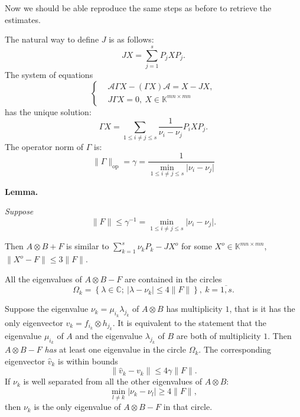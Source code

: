 \documentclass[a4paper]{jpconf}
\begin{document}
Now we should be able reproduce the same steps as before
    to retrieve the estimates.

The natural way to define \( J \) is as follows:
    \[
        JX = \sum_{j=1}^s P_j X P_j.
    \]
The system of equations
    \[\left\{\begin{aligned}
        & \mathcal{A}\Gamma X - (\Gamma X) \mathcal{A} = X - JX, \\
        & J\Gamma X = 0,\ X\in \mathbb{K}^{mn{\times}mn}
    \end{aligned}\right.\]
    has the unique solution:
    \[
        \Gamma X = \sum_{1\leq i{\neq}j \leq s} \frac{1}{\nu_i-\nu_j} P_i X P_j.
    \]
    The operator norm of \( \Gamma \) is:
    \[
        \|\Gamma\|_{\mathrm{op}} = \gamma = \frac{1}{\min_{1\leq i{\neq}j\leq s}\lvert\nu_i - \nu_j\rvert}
    \]


\begin{center}
\textbf{Lemma.}
{\it
    Suppose
    \[
        \|F\| \leq \gamma^{-1} = \min_{1\leq i{\neq}j\leq s}\lvert\nu_i - \nu_j\rvert.
    \]

    Then \( A{\otimes}B + F \) is similar to
    \( \sum_{k=1}^s \nu_k P_k - JX^o \) for some \( X^o \in \mathbb{K}^{mn{\times}mn} \),
    \( \|X^o - F\|\leq 3\|F\| \).

    All the eigenvalues of \( A{\otimes}B - F \) are contained in the circles
    \[
        \Omega_k = \left\{
            \lambda\in\mathbb{C};
            \ \lvert\lambda - \nu_k\rvert \leq 4\|F\|
            \right\},
        \ k{=}\overline{1,s}.
    \]

    Suppose the eigenvalue \( \nu_k=\mu_{i_k}\lambda_{j_k} \) of \( A{\otimes}B \) has multiplicity \( 1 \),
        that is it has the only eigenvector \( v_k = f_{i_k}{\otimes}h_{j_k} \).
    It is equivalent to the statement that the eigenvalue \( \mu_{i_k} \)
        of \( A \) and the eigenvalue \( \lambda_{j_k} \) of \( B \)
        are both of multiplicity \( 1 \).
    Then \( A{\otimes}B - F \) \emph{has} at least one
        eigenvalue in the circle \( \Omega_k \).
    The corresponding eigenvector \( \hat{v}_k \) is within bounds
    \[
        \|\hat{v}_k - v_k\| \leq 4\gamma \|F\|.
    \]
    If \( \nu_k \) is well separated from all the other eigenvalues of \( A{\otimes}B \):
    \[
        \min_{l\neq k}
        \lvert
        \nu_k - \nu_l
        \rvert
        \geq 4\|F\|,
    \]
    then \( \nu_k \) is the only eigenvalue of \( A{\otimes}B - F \)
    in that circle.
\/}
\end{center}
\end{document}
